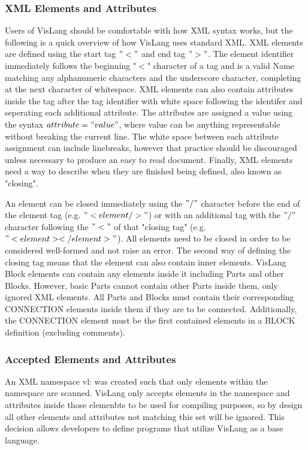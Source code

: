 \subsubsection{XML Elements and Attributes}
Users of VisLang should be comfortable with how XML syntax works, but the following is a quick overview of how VisLang uses standard XML.
XML elements are defined using the start tag $"<"$ and end tag $">"$.
The element identifier immediately follows the beginning "$<$" character of a tag and is a valid Name matching any alphanumeric characters and the underscore character, completing at the next character of whitespace.
XML elements can also contain attributes inside the tag after the tag identifier with white space following the identifer and seperating each additional attribute.
The attributes are assigned a value using the syntax $attribute="value"$, where value can be anything representable without breaking the current line.
The white space between each attribute assignment can include linebreaks, however that practice should be discouraged unless necessary to produce an easy to read document.
Finally, XML elements need a way to describe when they are finished being defined, also known as "closing".
\par
An element can be closed immediately using the $"/"$ character before the end of the element tag (e.g. $"<element/>"$) or with an additional tag with the $"/"$ character following the $"<"$ of that "closing tag" (e.g. $"<element></element>"$).
All elements need to be closed in order to be considered well-formed and not raise an error.
The second way of defining the closing tag means that the element can also contain inner elements.
VisLang Block elements can contain any elements inside it including Parts and other Blocks.
However, basic Parts cannot contain other Parts inside them, only ignored XML elements.
All Parts and Blocks must contain their corresponding CONNECTION elements inside them if they are to be connected.
Additionally, the CONNECTION element must be the first contained elements in a BLOCK definition (excluding comments).

\subsubsection{Accepted Elements and Attributes}
An XML namespace vl: was created such that only elements within the namespace are scanned.
VisLang only accepts elements in the namespace and attributes inside those elemenbts to be used for compiling purposes, so by design all other elements and attributes not matching this set will be ignored.
This decision allows developers to define programs that utilize VisLang as a base language.

